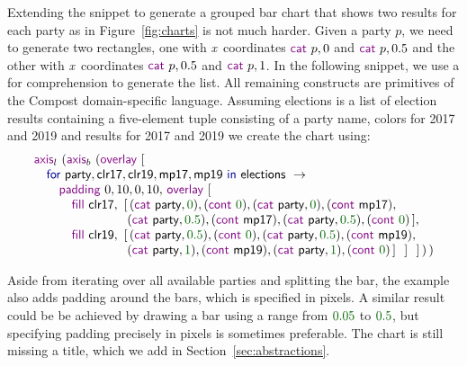 \documentclass{jfp}
\newcommand{\X}{\emph{x}\ }
\newcommand{\num}[1]{\textcolor{numclr}{#1}}
\newcommand{\ident}[1]{\textnormal{\textcolor{idclr}{\sffamily #1}}}
\newcommand{\kvd}[1]{\textnormal{\textcolor{kvdclr}{\sffamily #1}}}
\newcommand{\fkvd}[1]{\textnormal{\textcolor{fkvdclr}{\sffamily #1}}}
\begin{document}
Extending the snippet to generate a grouped bar chart that shows two results
for each party as in Figure~\ref{fig:charts} is not much harder. Given a party $p$, we need to
generate two rectangles, one with \X coordinates $\kvd{cat}~p, 0$ and $\kvd{cat}~p, 0.5$
and the other with \X coordinates $\kvd{cat}~p, 0.5$ and $\kvd{cat}~p, 1$.
In the following snippet, we use a \fkvd{for} comprehension to generate the list. All remaining
constructs are primitives of the Compost domain-specific language. Assuming \ident{elections} is a
list of election results containing a five-element tuple consisting of a party name, colors for
2017 and 2019 and results for 2017 and 2019 we create the chart using:
%
\begin{equation*}
\begin{array}{l}
  \kvd{axis}_l~(\kvd{axis}_b~(\kvd{overlay}~[\\
  \quad \fkvd{for}~\ident{party}, \ident{clr17}, \ident{clr19}, \ident{mp17}, \ident{mp19}~\fkvd{in}~\ident{elections}~\rightarrow\\
  \quad\quad \kvd{padding}~0,10,0,10,\,\kvd{overlay}~[\\
  \quad\quad\quad \kvd{fill}~\ident{clr17},~[\,(\kvd{cat}~\ident{party}, \num{0}), (\kvd{cont}~\num{0}), (\kvd{cat}~\ident{party}, \num{0}), (\kvd{cont}~\ident{mp17}),\\
  \quad\quad\quad \hspace{4.08em}           ~(\kvd{cat}~\ident{party}, \num{0.5}), (\kvd{cont}~\ident{mp17}), (\kvd{cat}~\ident{party}, \num{0.5}), (\kvd{cont}~\num{0}) \,], \\
  \quad\quad\quad \kvd{fill}~\ident{clr19},~[\,(\kvd{cat}~\ident{party}, \num{0.5}), (\kvd{cont}~\num{0}), (\kvd{cat}~\ident{party}, \num{0.5}), (\kvd{cont}~\ident{mp19}),\\
  \quad\quad\quad \hspace{4.08em}           ~(\kvd{cat}~\ident{party}, \num{1}), (\kvd{cont}~\ident{mp19}), (\kvd{cat}~\ident{party}, \num{1}), (\kvd{cont}~\num{0})\,]~~]~~]\,)\,)\\
\end{array}
\end{equation*}

\vspace{-0.5em}
\noindent
Aside from iterating over all available parties and splitting the bar, the example also adds padding
around the bars, which is specified in pixels. A similar
result could be be achieved by drawing a bar using a range from $\num{0.05}$ to $\num{0.5}$, but
specifying padding precisely in pixels is sometimes preferable.
The chart is still missing a title, which we add in Section~\ref{sec:abstractions}.
\end{document}
